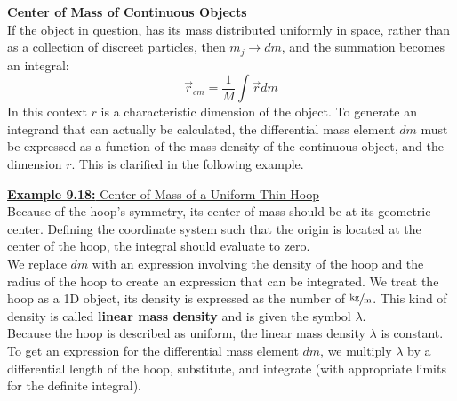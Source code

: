 \documentclass[a4paper]{article}
\let\bf\textbf
\begin{document}
\noindent\bf{Center of Mass of Continuous Objects}
\vspace{2mm}\\
If the object in question, has its mass distributed uniformly in space, rather than as a collection of discreet particles, then $m_j \to dm$, and the summation becomes an integral:
\begin{equation}
    \vec{r}_{cm} = \frac{1}{M}\int\vec{r}dm
\end{equation}
In this context $r$ is a characteristic dimension of the object. To generate an integrand that can actually be calculated, the differential mass element $dm$ must be expressed as a function of the mass density of the continuous object, and the dimension $r$. This is clarified in the following example.

\newpage
\begin{shaded}
    \underline{\bf{Example 9.18:} Center of Mass of a Uniform Thin Hoop}
    \vspace{2mm}\\
    Because of the hoop's symmetry, its center of mass should be at its geometric center. Defining the coordinate system such that the origin is located at the center of the hoop, the integral should evaluate to zero.
    \vspace{1mm}\\
    We replace $dm$ with an expression involving the density of the hoop and the radius of the hoop to create an expression that can be integrated. We treat the hoop as a 1D object, its density is expressed as the number of $\sfrac{\text{kg}}{\text{m}}$. This kind of density is called \bf{linear mass density} and is given the symbol $\lambda$.
    \vspace{1mm}\\
    Because the hoop is described as uniform, the linear mass density $\lambda$ is constant. To get an expression for the differential mass element $dm$, we multiply $\lambda$ by a differential length of the hoop, substitute, and integrate (with appropriate limits for the definite integral).\\
\end{shaded}
\end{document}
